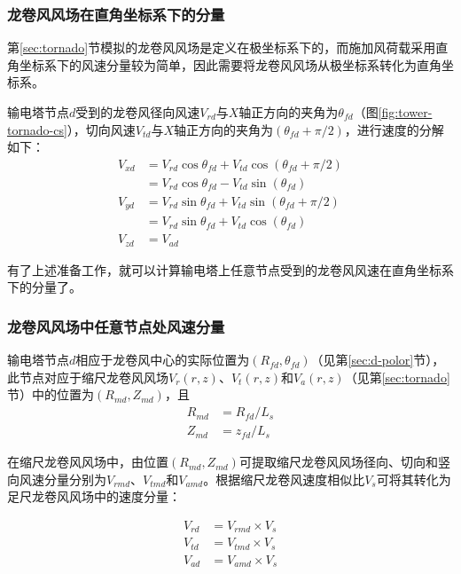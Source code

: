 \subsubsection{龙卷风风场在直角坐标系下的分量}\label{sec:cs}
第\ref{sec:tornado}节模拟的龙卷风风场是定义在极坐标系下的，而施加风荷载采用直角坐标系下的风速分量较为简单，因此需要将龙卷风风场从极坐标系转化为直角坐标系。

输电塔节点$d$受到的龙卷风径向风速$V_{rd}$与$X$轴正方向的夹角为$\theta_{fd}$（图\ref{fig:tower-tornado-cs}），切向风速$V_{td}$与$X$轴正方向的夹角为$(\theta_{fd}+\pi/2)$，进行速度的分解如下：
\begin{equation}
	\begin{split}
		V_{xd} & = V_{rd} \cos\theta_{fd} + V_{td} \cos(\theta_{fd}+\pi/2) \\
		& = V_{rd} \cos\theta_{fd} - V_{td} \sin(\theta_{fd}) \\
		V_{yd} & = V_{rd} \sin\theta_{fd} + V_{td} \sin(\theta_{fd}+\pi/2) \\
		& = V_{rd} \sin\theta_{fd} + V_{td} \cos(\theta_{fd}) \\   
		V_{zd} & = V_{ad}  
	\end{split}
\end{equation}

有了上述准备工作，就可以计算输电塔上任意节点受到的龙卷风风速在直角坐标系下的分量了。

\subsubsection{龙卷风风场中任意节点处风速分量}
输电塔节点$d$相应于龙卷风中心的实际位置为$(R_{fd}, \theta_{fd})$（见第\ref{sec:d-polor}节），此节点对应于缩尺龙卷风风场$V_r(r,z)$、$V_t(r,z)$和$V_a(r,z)$（见第\ref{sec:tornado}节）中的位置为$(R_{md}, Z_{md})$，且
\begin{equation}
	\begin{split}
		R_{md} & = R_{fd} / L_s \\
		Z_{md} & = z_{fd} / L_s
	\end{split}
\end{equation}

在缩尺龙卷风风场中，由位置$(R_{md}, Z_{md})$可提取缩尺龙卷风风场径向、切向和竖向风速分量分别为$V_{rmd}$、$V_{tmd}$和$V_{amd}$。根据缩尺龙卷风速度相似比$V_s$可将其转化为足尺龙卷风风场中的速度分量：

\begin{equation}
	\begin{split}
		V_{rd} &= V_{rmd} \times V_s \\
		V_{td} &= V_{tmd} \times V_s \\
		V_{ad} &= V_{amd} \times V_s
	\end{split}
\end{equation}

